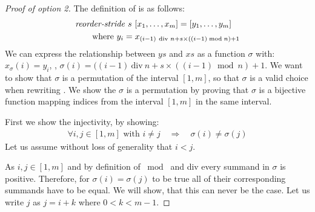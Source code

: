 \begin{proof}[Proof of option 2]
  The definition of \reorderStride is as follows:
  \begin{align*}
    &\text{\textit{reorder-stride}}\ s\ [x_1, \ldots, x_m] = [y_1, \ldots, y_m]\\
    &\qquad \text{where}\ y_i = x_{(i-1)\ \text{\normalfont div } n + s\times ((i-1) \bmod{n}) + 1}
  \end{align*}
  We can express the relationship between $ys$ and $xs$ as a function $\sigma$ with: $x_\sigma(i) = y_i$, \ie, $\sigma(i) = ((i-1)\ \text{div}\ n + s\times ((i-1) \bmod{n}) + 1$.
  We want to show that $\sigma$ is a permutation of the interval $[1, m]$, so that $\sigma$ is a valid choice when rewriting \reduce.
  We show the $\sigma$ is a permutation by proving that $\sigma$ is a bijective function mapping indices from the interval $[1,m]$ in the same interval.

  First we show the injectivity, by showing:
  \begin{align*}
    \forall i, j \in [1, m] \text{ with } i\neq j \quad \Rightarrow \quad \sigma(i)\neq \sigma(j)
  \end{align*}
  Let us assume without loss of generality that $i< j$.

%
  As $i,j\in [1,m]$ and by definition of $\bmod{}$ and div every summand in $\sigma$ is positive.
  Therefore, for $\sigma(i) = \sigma(j)$ to be true all of their corresponding summands have to be equal.
  We will show, that this can never be the case.
  Let us write $j$ as $j=i+k$ where $0<k<m-1$.


\end{proof}
